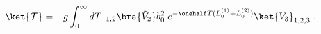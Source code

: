 \begin{equation}
\label{eq:firststep}
\ket{{\mathcal T}} = -g\int_0^{\infty} dT \,
\left._{1,2}\bra{\tilde{V}_2}b_0^{2} \; e^{-\onehalf T (L_0^{(1)} +
L_0^{(2)}) } \ket{V_3}_{1,2,3} \right. .
\end{equation}

